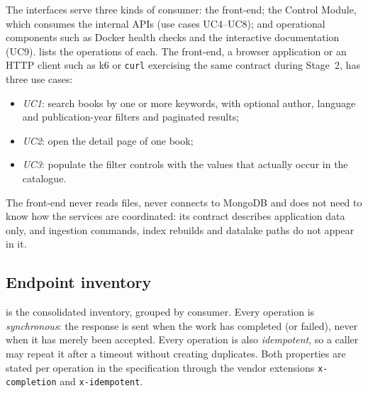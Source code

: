 \documentclass[10pt,a4paper]{article}
\newcommand{\code}[1]{\texttt{#1}}
\begin{document}
The interfaces serve three kinds of consumer: the front-end; the Control
Module, which consumes the internal APIs (use cases UC4--UC8); and operational
components such as Docker health checks and the interactive documentation
(UC9).  lists the operations of each. The front-end, a
browser application or an HTTP client such as k6 or \code{curl} exercising the
same contract during Stage~2, has three use cases:

\begin{itemize}
  \item \emph{UC1}: search books by one or more keywords, with optional author,
  language and publication-year filters and paginated results;
  \item \emph{UC2}: open the detail page of one book;
  \item \emph{UC3}: populate the filter controls with the values that actually
  occur in the catalogue.
\end{itemize}

The front-end never reads files, never connects to MongoDB and does not need
to know how the services are coordinated: its contract describes application
data only, and ingestion commands, index rebuilds and datalake paths do not
appear in it.

\subsection{Endpoint inventory}
\label{sec:inventory}

 is the consolidated inventory, grouped by consumer. Every
operation is \emph{synchronous}: the response is sent when the work has
completed (or failed), never when it has merely been accepted. Every operation
is also \emph{idempotent}, so a caller may repeat it after a timeout without
creating duplicates. Both properties are stated per operation in the
specification through the vendor extensions \code{x-completion} and
\code{x-idempotent}.
\end{document}
